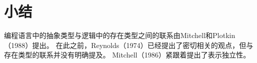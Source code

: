 \section{小结}

编程语言中的抽象类型与逻辑中的存在类型之间的联系由Mitchell和Plotkin（1988）提出。 
在此之前，Reynolds（1974）已经提出了密切相关的观点，但与存在类型的联系并没有明确提及。
Mitchell（1986）紧跟着提出了表示独立性。